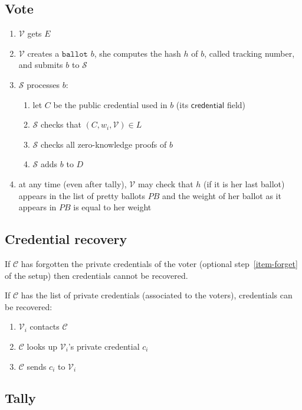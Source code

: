 \documentclass[a4paper]{article}
\newcommand{\ballot}{\texttt{ballot}}
\begin{document}
\subsection{Vote}

\begin{enumerate}
\item $\mathcal{V}$ gets $E$
\item $\mathcal{V}$ creates a \hyperref[ballots]{$\ballot$} $b$, she
  computes the hash $h$ of $b$, called tracking number, and submits $b$ to $\mathcal{S}$
\item $\mathcal{S}$ processes $b$:
  \begin{enumerate}
  \item let $C$ be the public credential used in $b$ (its
    $\textsf{credential}$ field)
  \item $\mathcal{S}$ checks that $(C,w_i,\mathcal{V})\in L$
  \item $\mathcal{S}$ checks all zero-knowledge proofs of $b$
  \item $\mathcal{S}$ adds $b$ to $D$
  \end{enumerate}
\item at any time (even after tally), $\mathcal{V}$ may check that $h$
  (if it is her last ballot)
  appears in the list of pretty ballots $PB$ and the weight of her
  ballot as it appears in $PB$ is equal to her weight
\end{enumerate}


\subsection{Credential recovery}

If $\mathcal C$ has forgotten the private credentials of the voter
(optional step~\ref{item-forget} of the setup) then credentials cannot
be recovered.

If $\mathcal C$ has the list of private credentials (associated to the
voters), credentials can be recovered:
\begin{enumerate}
\item $\mathcal{V}_i$ contacts $\mathcal{C}$
\item $\mathcal{C}$ looks up $\mathcal{V}_i$'s private credential $c_i$
\item $\mathcal{C}$ sends $c_i$ to $\mathcal{V}_i$
\end{enumerate}

\subsection{Tally}
\end{document}
